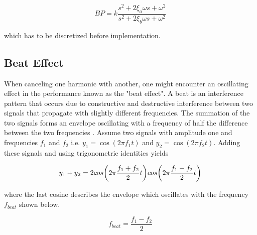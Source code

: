 \begin{equation}
  \label{eq:bandpass}
  BP = k\frac{s^2 + 2\xi_a\omega s + \omega^2}{s^2 + 2\xi_b\omega s + \omega^2}
\end{equation}

which has to be discretized before implementation.
\newpage
\subsection{Beat Effect}\label{subsec:beat}
When canceling one harmonic with another, one might encounter an oscillating effect in the performance known as the "beat effect".
A beat is an interference pattern that occurs due to constructive and destructive interference between two signals that propagate with slightly different frequencies. The summation of the two signals forms an envelope oscillating with a frequency of half the difference between the two frequencies \citep{beat:2016}. Assume two signals with amplitude one and frequencies $f_1$ and $f_2$ i.e. $y_1 = \cos(2\pi f_1t)$ and $y_2 = \cos(2\pi f_2t)$. Adding these signals and using trigonometric identities yields

\begin{equation}
  y_1 + y_2 = 2cos\bigg(2\pi\frac{f_1+f_2}{2}t\bigg)cos\bigg(2\pi\frac{f_1-f_2}{2}t\bigg)
  \vspace{0.3cm}
\end{equation}

where the last cosine describes the envelope which oscillates with the frequency $f_{beat}$ shown below.

\begin{equation}
  \label{eq:beat}
  f_{beat} = \frac{f_1-f_2}{2}
\end{equation}
